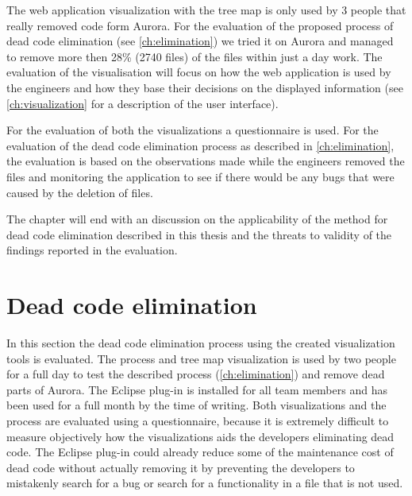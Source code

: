 The web application visualization with the tree map is only used by 3 people that really removed code form Aurora. For the evaluation of the proposed process of dead code elimination (see \autoref{ch:elimination}) we tried it on Aurora and managed to remove more then 28\% (2740 files) of the files within just a day work. The evaluation of the visualisation will focus on how the web application is used by the engineers and how they base their decisions on the displayed information (see \autoref{ch:visualization} for a description of the user interface).

For the evaluation of both the visualizations a questionnaire is used. For the evaluation of the dead code elimination process as described in \autoref{ch:elimination}, the evaluation is based on the observations made while the engineers removed the files and monitoring the application to see if there would be any bugs that were caused by the deletion of files. 

The chapter will end with an discussion on the applicability of the method for dead code elimination described in this thesis and the threats to validity of the findings reported in the evaluation.








\section{Dead code elimination}



In this section the dead code elimination process using the created visualization tools is evaluated. The process and tree map visualization is used by two people for a full day to test the described process (\autoref{ch:elimination}) and remove dead parts of Aurora. The Eclipse plug-in is installed for all team members and has been used for a full month by the time of writing. Both visualizations and the process are evaluated using a questionnaire, because it is extremely difficult to measure objectively how the visualizations aids the developers eliminating dead code. The Eclipse plug-in could already reduce some of the maintenance cost of dead code without actually removing it by preventing the developers to mistakenly search for a bug or search for a functionality in a file that is not used.

